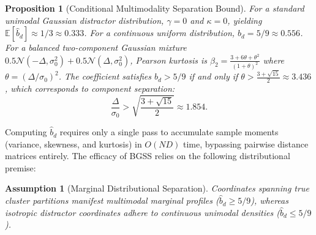 \documentclass[pdflatex,sn-mathphys-num]{sn-jnl}
\theoremstyle{thmstyleone}
\newtheorem{proposition}[theorem]{Proposition}
\theoremstyle{thmstyletwo}
\theoremstyle{thmstylethree}
\newtheorem{assumption}{Assumption}
\begin{document}
\begin{proposition}[Conditional Multimodality Separation Bound]\label{prop:multimodal_bound}
For a standard unimodal Gaussian distractor distribution, $\gamma = 0$ and $\kappa = 0$, yielding $\mathbb{E}[\hat{b}_d] \approx 1/3 \approx 0.333$. For a continuous uniform distribution, $b_d = 5/9 \approx 0.556$. For a balanced two-component Gaussian mixture $0.5\mathcal{N}(-\Delta, \sigma_0^2) + 0.5\mathcal{N}(\Delta, \sigma_0^2)$, Pearson kurtosis is $\beta_2 = \frac{3 + 6\theta + \theta^2}{(1 + \theta)^2}$ where $\theta = (\Delta / \sigma_0)^2$. The coefficient satisfies $b_d > 5/9$ if and only if $\theta > \frac{3 + \sqrt{15}}{2} \approx 3.436$, which corresponds to component separation:
\begin{equation}
 \frac{\Delta}{\sigma_0} > \sqrt{\frac{3 + \sqrt{15}}{2}} \approx 1.854.
\end{equation}
\end{proposition}

Computing $\hat{b}_d$ requires only a single pass to accumulate sample moments (variance, skewness, and kurtosis) in $O(ND)$ time, bypassing pairwise distance matrices entirely. The efficacy of BGSS relies on the following distributional premise:
\begin{assumption}[Marginal Distributional Separation]\label{assump:multimodal}
Coordinates spanning true cluster partitions manifest multimodal marginal profiles ($\hat{b}_d \ge 5/9$), whereas isotropic distractor coordinates adhere to continuous unimodal densities ($\hat{b}_d \le 5/9$).
\end{assumption}
\end{document}
